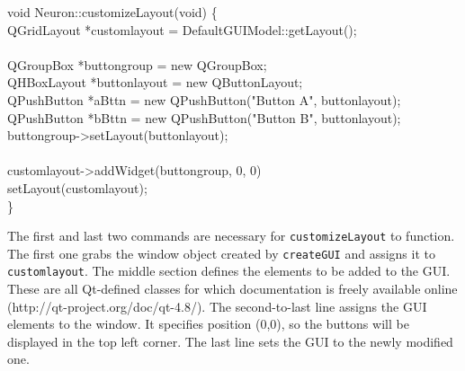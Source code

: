 \begin{maxipage}
\begin{example}
\hspace{0cm}void Neuron::customizeLayout(void) \{\\
\hspace{.5cm}QGridLayout *customlayout = DefaultGUIModel::getLayout();\\
\hspace{.5cm}\\
\hspace{.5cm}QGroupBox *buttongroup = new QGroupBox;\\
\hspace{.5cm}QHBoxLayout *buttonlayout = new QButtonLayout;\\
\hspace{.5cm}QPushButton *aBttn = new QPushButton("Button A", buttonlayout);\\
\hspace{.5cm}QPushButton *bBttn = new QPushButton("Button B", buttonlayout);\\
\hspace{.5cm}buttongroup->setLayout(buttonlayout);\\
\hspace{.5cm}\\
\hspace{.5cm}customlayout->addWidget(buttongroup, 0, 0)\\
\hspace{.5cm}setLayout(customlayout);\\
\}\\
\end{example}
\end{maxipage}

The first and last two commands are necessary for \texttt{customizeLayout} to function. The first one grabs the window object created by \texttt{createGUI} and assigns it to \texttt{customlayout}. The middle section defines the elements to be added to the GUI. These are all Qt-defined classes for which documentation is freely available online (http://qt-project.org/doc/qt-4.8/). The second-to-last line assigns the GUI elements to the window. It specifies position (0,0), so the buttons will be displayed in the top left corner. The last line sets the GUI to the newly modified one. 